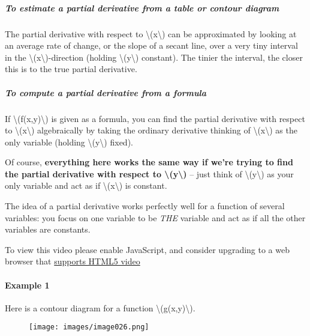 \hypertarget{to-estimate-a-partial-derivative-from-a-table-or-contour-diagram}{%
\subparagraph{To estimate a partial derivative from a table or contour
diagram}\label{to-estimate-a-partial-derivative-from-a-table-or-contour-diagram}}

The partial derivative with respect to
\textbackslash{}(x\textbackslash{}) can be approximated by looking at an
average rate of change, or the slope of a secant line, over a very tiny
interval in the \textbackslash{}(x\textbackslash{})-direction (holding
\textbackslash{}(y\textbackslash{}) constant). The tinier the interval,
the closer this is to the true partial derivative.

\hypertarget{to-compute-a-partial-derivative-from-a-formula}{%
\subparagraph{To compute a partial derivative from a
formula}\label{to-compute-a-partial-derivative-from-a-formula}}

If \textbackslash{}(f(x,y)\textbackslash{}) is given as a formula, you
can find the partial derivative with respect to
\textbackslash{}(x\textbackslash{}) algebraically by taking the ordinary
derivative thinking of \textbackslash{}(x\textbackslash{}) as the only
variable (holding \textbackslash{}(y\textbackslash{}) fixed).

Of course, \textbf{everything here works the same way if we're trying to
find the partial derivative with respect to
\textbackslash{}(y\textbackslash{})} -- just think of
\textbackslash{}(y\textbackslash{}) as your only variable and act as if
\textbackslash{}(x\textbackslash{}) is constant.

The idea of a partial derivative works perfectly well for a function of
several variables: you focus on one variable to be \emph{THE} variable
and act as if all the other variables are constants.

To view this video please enable JavaScript, and consider upgrading to a
web browser that \href{http://videojs.com/html5-video-support/}{supports
HTML5 video}

\hypertarget{example-1}{%
\paragraph{Example 1}\label{example-1}}

Here is a contour diagram for a function
\textbackslash{}(g(x,y)\textbackslash{}).

\begin{figure}
\centering
\texttt{[image: images/image026.png]}
\caption{}
\end{figure}

